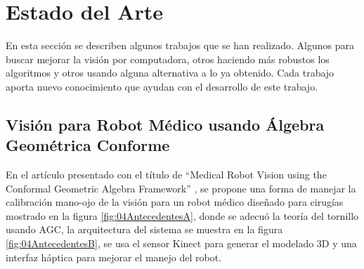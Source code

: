 \section{Estado del Arte}

    En esta sección se describen algunos trabajos que se han realizado. Algunos para buscar mejorar la visión por computadora, otros haciendo más robustos los algoritmos y otros usando alguna alternativa a lo ya obtenido. Cada trabajo aporta nuevo conocimiento que ayudan con el desarrollo de este trabajo.\\
    
    \subsection{Visión para Robot Médico usando Álgebra Geométrica Conforme}
    
        En el artículo presentado con el título de “Medical Robot Vision using the Conformal Geometric Algebra Framework” \cite{MedicalVisionAGC}, se propone una forma de manejar la calibración mano-ojo de la visión para un robot médico diseñado para cirugías mostrado en la figura \ref{fig:04AntecedentesA}, donde se adecuó  la teoría del tornillo usando AGC, la arquitectura del sistema se muestra en la figura \ref{fig:04AntecedentesB}, se usa el sensor Kinect para generar el modelado 3D y una interfaz háptica para mejorar el manejo del robot.\\
        

